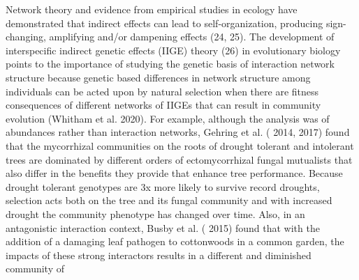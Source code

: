 \documentclass{article}
\begin{document}
Network theory and evidence from empirical studies in ecology have
demonstrated that indirect effects can lead to self-organization,
producing sign-changing, amplifying and/or dampening effects (24,
25). The development of interspecific indirect genetic effects (IIGE)
theory (26) in evolutionary biology points to the importance of
studying the genetic basis of interaction network structure because
genetic based differences in network structure among individuals can
be acted upon by natural selection when there are fitness consequences
of different networks of IIGEs that can result in community evolution
(Whitham et al. %
2020). For example, although the analysis was of abundances rather than interaction networks, Gehring et al. (%
2014, %
%
2017) found that the mycorrhizal communities on the roots of drought
tolerant and intolerant trees are dominated by different orders of
ectomycorrhizal fungal mutualists that also differ in the benefits
they provide that enhance tree performance. Because drought tolerant
genotypes are 3x more likely to survive record droughts, selection
acts both on the tree and its fungal community and with increased
drought the community phenotype has changed over time. Also, in an
antagonistic interaction context, Busby et al. (%
2015) found that with the addition of a damaging leaf pathogen to
cottonwoods in a common garden, the impacts of these strong
interactors results in a different and diminished community of
\end{document}
